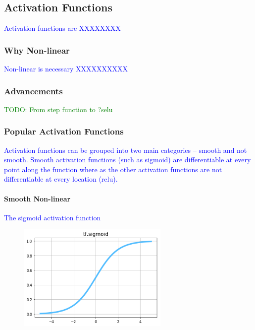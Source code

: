 \subsection{Activation Functions}

\textcolor{blue}{Activation functions are XXXXXXXX}

\subsubsection{Why Non-linear}

\textcolor{blue}{Non-linear is necessary XXXXXXXXXX}

\subsubsection{Advancements}

\textcolor{green}{TODO: From step function to ?selu}

\subsubsection{Popular Activation Functions}

\textcolor{blue}{Activation functions can be grouped into two main categories -- smooth and not smooth. Smooth activation functions (such as sigmoid) are differentiable at every point along the function where as the other activation functions are not differentiable at every location (relu).}

\paragraph{Smooth Non-linear}

\textcolor{blue}{The sigmoid activation function}

\begin{figure}
\centering
\includegraphics[width=0.65\textwidth]{./sync_imgs/act/smooth/sigmoid.png}
\label{fig:act_smooth_sigmoid}
\end{figure}

